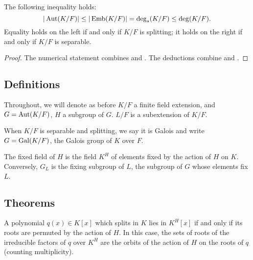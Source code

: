 \begin{theorem} The following inequality holds:
\begin{equation*}
|\operatorname{\text{Aut}}(K/F)| \leq |\operatorname{\text{Emb}}(K/F)| = \deg_s(K/F) \leq \deg(K/F).
\end{equation*}
Equality holds on the left if and only if $K/F$ is splitting; it holds on the
right if and only if $K/F$ is separable.
\label{galois_size}
\end{theorem}

\begin{proof} The numerical statement combines  and
.  The deductions combine  and
. \end{proof}

\subsection{Definitions}

Throughout, we will denote as before $K/F$ a finite field extension, and $G =
\operatorname{\text{Aut}}(K/F)$, $H$ a subgroup of $G$.  $L/F$ is a subextension of $K/F$.

\begin{definition} When $K/F$ is separable and splitting, we say it is Galois and
write $G = \operatorname{\text{Gal}}(K/F)$, the Galois group of $K$ over $F$.
\label{defn:galois_extension}
\end{definition}

\begin{definition} The fixed field of $H$ is the field $K^H$ of elements fixed by
the action of $H$ on $K$.  Conversely, $G_L$ is the fixing subgroup of $L$,
the subgroup of $G$ whose elements fix $L$.
\label{defn:fixing}
\end{definition}

\subsection{Theorems}

\begin{lemma} A polynomial $q(x) \in K[x]$ which splits in $K$ lies in
$K^H[x]$ if and only if its roots are permuted by the action of $H$.  In this
case, the sets of roots of the irreducible factors of $q$ over $K^H$ are the orbits
of the action of $H$ on the roots of $q$ (counting multiplicity).
\label{root_action}
\end{lemma}

